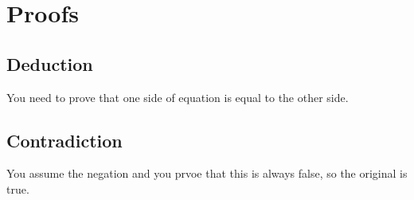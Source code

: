 \documentclass[../main.tex]{subfiles}
\begin{document}
\section{Proofs}

\subsection{Deduction}

You need to prove that one side of equation is equal to the other side.
\subsection{Contradiction}
You assume the negation and you prvoe that this is always false, so the original is true.
\end{document}
